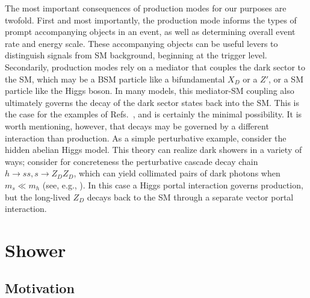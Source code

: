 The most important consequences of production modes for our purposes are twofold. First and most importantly, the production mode informs the types of prompt accompanying objects in an event, as well as determining overall event rate and energy scale. These accompanying objects can be useful levers to distinguish signals from SM background, beginning at the trigger level. Secondarily, production modes rely on a mediator that couples the dark sector to the SM, which may be a BSM particle like a bifundamental $X_D$ or a $Z'$, or a SM particle like the Higgs boson. In many models, this mediator-SM coupling also ultimately governs the decay of the dark sector states back into the SM. This is the case for the examples of Refs.~\cite{Schwaller:2015gea,Strassler:2006ri,Strassler:2006im,Han:2007ae,Cohen:2015toa,Renner:2018fhh,Craig:2015pha,Craig:2016kue,Curtin:2015fna}, and is certainly the minimal possibility. It is worth mentioning, however, that decays may be governed by a different interaction than production.  As a simple perturbative example, consider the hidden abelian Higgs model. This theory can realize dark showers in a variety of ways; consider for concreteness the perturbative cascade decay chain $h\to ss, s \to Z_D Z_D$, which can yield collimated pairs of dark photons when $m_s\ll m_h$ (see, e.g., \cite{Izaguirre:2018atq}). In this case a Higgs portal interaction governs production, but the long-lived $Z_D$ decays back to the SM through a separate vector portal interaction.

\section{Shower}
\label{sec:darkshowershower}

\subsection{Motivation}

